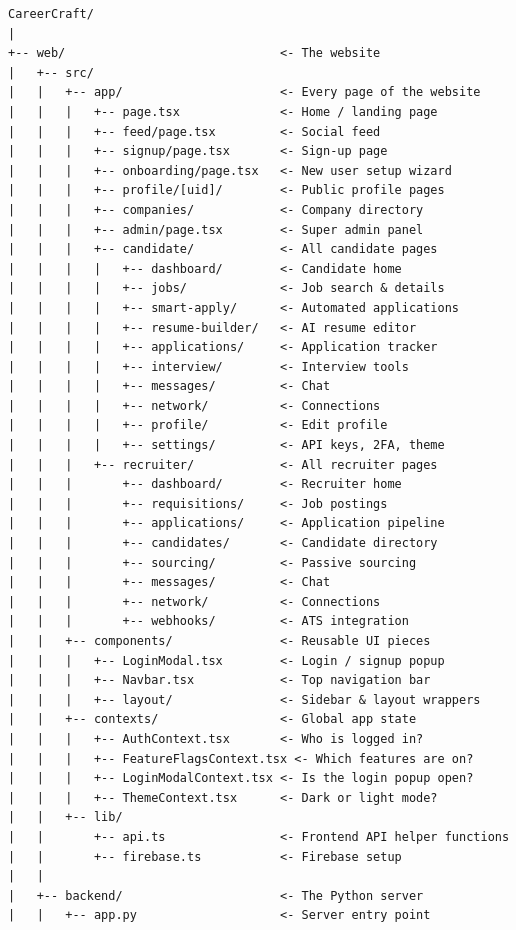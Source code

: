 \documentclass[12pt, a4paper]{report}
\begin{document}
\begin{lstlisting}[style=asciistyle, caption={Complete project folder structure}]
CareerCraft/
|
+-- web/                              <- The website
|   +-- src/
|   |   +-- app/                      <- Every page of the website
|   |   |   +-- page.tsx              <- Home / landing page
|   |   |   +-- feed/page.tsx         <- Social feed
|   |   |   +-- signup/page.tsx       <- Sign-up page
|   |   |   +-- onboarding/page.tsx   <- New user setup wizard
|   |   |   +-- profile/[uid]/        <- Public profile pages
|   |   |   +-- companies/            <- Company directory
|   |   |   +-- admin/page.tsx        <- Super admin panel
|   |   |   +-- candidate/            <- All candidate pages
|   |   |   |   +-- dashboard/        <- Candidate home
|   |   |   |   +-- jobs/             <- Job search & details
|   |   |   |   +-- smart-apply/      <- Automated applications
|   |   |   |   +-- resume-builder/   <- AI resume editor
|   |   |   |   +-- applications/     <- Application tracker
|   |   |   |   +-- interview/        <- Interview tools
|   |   |   |   +-- messages/         <- Chat
|   |   |   |   +-- network/          <- Connections
|   |   |   |   +-- profile/          <- Edit profile
|   |   |   |   +-- settings/         <- API keys, 2FA, theme
|   |   |   +-- recruiter/            <- All recruiter pages
|   |   |       +-- dashboard/        <- Recruiter home
|   |   |       +-- requisitions/     <- Job postings
|   |   |       +-- applications/     <- Application pipeline
|   |   |       +-- candidates/       <- Candidate directory
|   |   |       +-- sourcing/         <- Passive sourcing
|   |   |       +-- messages/         <- Chat
|   |   |       +-- network/          <- Connections
|   |   |       +-- webhooks/         <- ATS integration
|   |   +-- components/               <- Reusable UI pieces
|   |   |   +-- LoginModal.tsx        <- Login / signup popup
|   |   |   +-- Navbar.tsx            <- Top navigation bar
|   |   |   +-- layout/               <- Sidebar & layout wrappers
|   |   +-- contexts/                 <- Global app state
|   |   |   +-- AuthContext.tsx       <- Who is logged in?
|   |   |   +-- FeatureFlagsContext.tsx <- Which features are on?
|   |   |   +-- LoginModalContext.tsx <- Is the login popup open?
|   |   |   +-- ThemeContext.tsx      <- Dark or light mode?
|   |   +-- lib/
|   |       +-- api.ts                <- Frontend API helper functions
|   |       +-- firebase.ts           <- Firebase setup
|   |
|   +-- backend/                      <- The Python server
|   |   +-- app.py                    <- Server entry point

\end{lstlisting}
\end{document}
